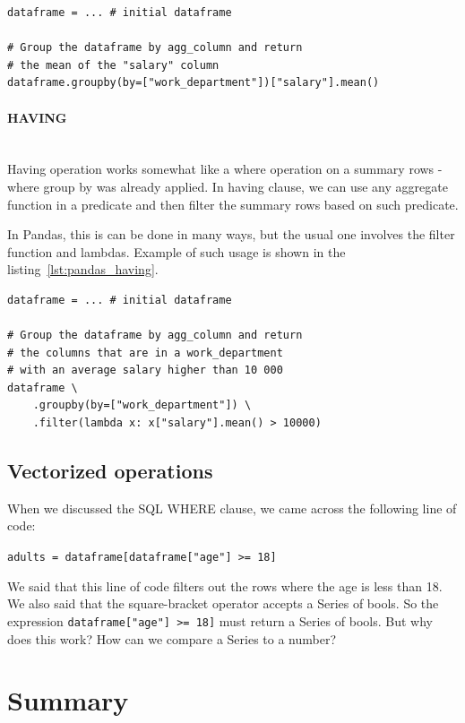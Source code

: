 \begin{lstlisting}[caption=Group by in Pandas, label={lst:pandas_groupby}, captionpos=b]
dataframe = ... # initial dataframe

# Group the dataframe by agg_column and return
# the mean of the "salary" column
dataframe.groupby(by=["work_department"])["salary"].mean()
\end{lstlisting}

\paragraph{HAVING} \leavevmode \\

Having operation works somewhat like a where operation on a summary rows - where group by was already applied.
In having clause, we can use any aggregate function in a predicate and then filter the summary rows based on such
predicate.

In Pandas, this is can be done in many ways, but the usual one involves the filter function and lambdas.
Example of such usage is shown in the listing~\ref{lst:pandas_having}.

\begin{lstlisting}[caption=Having in Pandas, label={lst:pandas_having}, captionpos=b]
dataframe = ... # initial dataframe

# Group the dataframe by agg_column and return
# the columns that are in a work_department
# with an average salary higher than 10 000
dataframe \
    .groupby(by=["work_department"]) \
    .filter(lambda x: x["salary"].mean() > 10000)
\end{lstlisting}


\subsection{Vectorized operations}

When we discussed the SQL WHERE clause, we came across the following line of code:

\verb|adults = dataframe[dataframe["age"] >= 18]|

We said that this line of code filters out the rows where the age is less than 18.
We also said that the square-bracket operator accepts a Series of bools.
So the expression \verb|dataframe["age"] >= 18]| must return a Series of bools.
But why does this work?
How can we compare a Series to a number?
\xxx{TODO}


\section*{Summary} %

